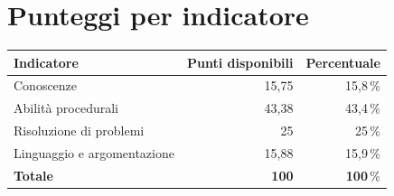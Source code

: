 \documentclass[11pt,a4paper]{article}
\begin{document}
\section*{Punteggi per indicatore}
\begin{center}
\begin{tabular}{@{}lrr@{}}
\toprule
\textbf{Indicatore} & \textbf{Punti disponibili} & \textbf{Percentuale} \\
\midrule

Conoscenze & 15,75 & 15,8\,\% \\

Abilità procedurali & 43,38 & 43,4\,\% \\

Risoluzione di problemi & 25 & 25\,\% \\

Linguaggio e argomentazione & 15,88 & 15,9\,\% \\

\midrule
\textbf{Totale} & \textbf{100} & \textbf{100}\,\% \\
\bottomrule
\end{tabular}
\end{center}
\end{document}
